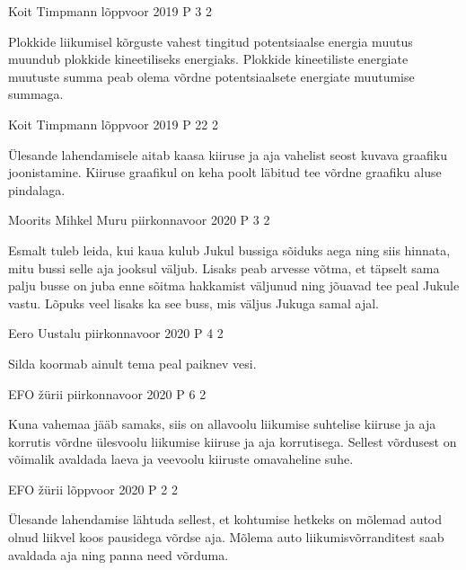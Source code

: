 \documentclass[11pt]{article}
\begin{document}
{%
{Koit Timpmann} %
{lõppvoor} %
{2019} %
{P 3} %
{2} %
{

\ifHint
Plokkide liikumisel kõrguste vahest tingitud potentsiaalse energia muutus muundub plokkide kineetiliseks energiaks. Plokkide kineetiliste energiate muutuste summa peab olema võrdne potentsiaalsete energiate muutumise summaga.
\fi
}

{Koit Timpmann} %
{lõppvoor} %
{2019} %
{P 22} %
{2} %
{

\ifHint
Ülesande lahendamisele aitab kaasa kiiruse ja aja vahelist seost kuvava graafiku joonistamine. Kiiruse graafikul on keha poolt läbitud tee võrdne graafiku aluse pindalaga.
\fi
}

{Moorits Mihkel Muru} %
{piirkonnavoor} %
{2020} %
{P 3} %
{2} %
{

\ifHint
Esmalt tuleb leida, kui kaua kulub Jukul bussiga sõiduks aega ning siis hinnata, mitu bussi selle aja jooksul väljub. Lisaks peab arvesse võtma, et täpselt sama palju busse on juba enne sõitma hakkamist väljunud ning jõuavad tee peal Jukule vastu. Lõpuks veel lisaks ka see buss, mis väljus Jukuga samal ajal.
\fi
}


{Eero Uustalu} %
{piirkonnavoor} %
{2020} %
{P 4} %
{2} %
{

\ifHint
Silda koormab ainult tema peal paiknev vesi.
\fi
}

{EFO žürii} %
{piirkonnavoor} %
{2020} %
{P 6} %
{2} %
{

\ifHint
Kuna vahemaa jääb samaks, siis on allavoolu liikumise suhtelise kiiruse ja aja korrutis võrdne ülesvoolu liikumise kiiruse ja aja korrutisega. Sellest võrdusest on võimalik avaldada laeva ja veevoolu kiiruste omavaheline suhe.
\fi
}

{EFO žürii} %
{lõppvoor} %
{2020} %
{P 2} %
{2} %
{

\ifHint
Ülesande lahendamise lähtuda sellest, et kohtumise hetkeks on mõlemad autod olnud liikvel koos pausidega võrdse aja. Mõlema auto liikumisvõrranditest saab avaldada aja ning panna need võrduma.
\fi
}


}
\end{document}

